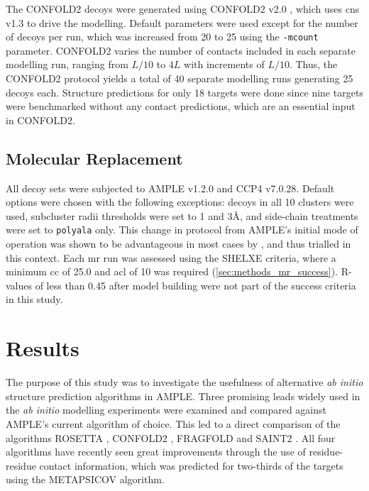 The CONFOLD2 decoys were generated using CONFOLD2 v2.0 \cite{Adhikari2018-lj}, which uses \gls{cns} v1.3 \cite{Brunger1998-sz} to drive the modelling. Default parameters were used except for the number of decoys per run, which was increased from 20 to 25 using the \texttt{-mcount} parameter. CONFOLD2 varies the number of contacts included in each separate modelling run, ranging from $L/10$ to $4L$ with increments of $L/10$. Thus, the CONFOLD2 protocol yields a total of 40 separate modelling runs generating 25 decoys each. Structure predictions for only 18 targets were done since nine targets were benchmarked without any contact predictions, which are an essential input in CONFOLD2.

\subsection{Molecular Replacement}
All decoy sets were subjected to AMPLE v1.2.0 and CCP4 v7.0.28. Default options were chosen with the following exceptions: decoys in all 10 clusters were used, subcluster radii thresholds were set to 1 and 3\AA, and side-chain treatments were set to \texttt{polyala} only. This change in protocol from AMPLE's initial mode of operation \cite{Bibby2012-lm} was shown to be advantageous in most cases by \textcite{Thomas2017-qu}, and thus trialled in this context.  Each \gls{mr} run was assessed using the SHELXE criteria, where a minimum \gls{cc} of 25.0 and \gls{acl} of 10 was required (\cref{sec:methods_mr_success}). R-values of less than 0.45 after model building were not part of the success criteria in this study.

\section{Results}
The purpose of this study was to investigate the usefulness of alternative \textit{ab initio} structure prediction algorithms in AMPLE. Three promising leads widely used in the \textit{ab initio} modelling experiments were examined and compared against AMPLE's current algorithm of choice. This led to a direct comparison of the algorithms ROSETTA \cite{Rohl2004-dj}, CONFOLD2 \cite{Adhikari2018-lj}, FRAGFOLD \cite{Jones2001-mc} and SAINT2 \cite{De_Oliveira2017-sg}. All four algorithms have recently seen great improvements through the use of residue-residue contact information, which was predicted for two-thirds of the targets using the METAPSICOV \cite{Jones2015-vq} algorithm.

